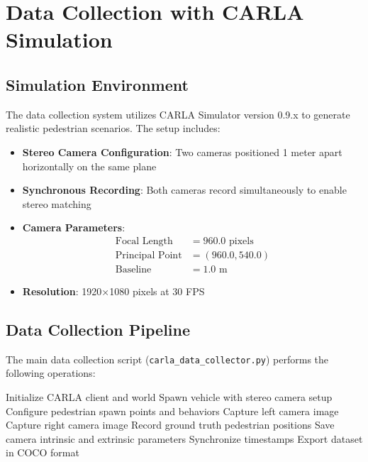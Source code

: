 \documentclass[11pt,a4paper]{article}
\begin{document}
\section{Data Collection with CARLA Simulation}

\subsection{Simulation Environment}

The data collection system utilizes CARLA Simulator version 0.9.x to generate realistic pedestrian scenarios. The setup includes:

\begin{itemize}
    \item \textbf{Stereo Camera Configuration}: Two cameras positioned 1 meter apart horizontally on the same plane
    \item \textbf{Synchronous Recording}: Both cameras record simultaneously to enable stereo matching
    \item \textbf{Camera Parameters}:
    \begin{align*}
        \text{Focal Length} &= 960.0 \text{ pixels} \\
        \text{Principal Point} &= (960.0, 540.0) \\
        \text{Baseline} &= 1.0 \text{ m}
    \end{align*}
    \item \textbf{Resolution}: 1920×1080 pixels at 30 FPS
\end{itemize}

\subsection{Data Collection Pipeline}

The main data collection script (\texttt{carla\_data\_collector.py}) performs the following operations:

\begin{algorithm}
\caption{CARLA Data Collection Process}
\begin{algorithmic}[1]
\State Initialize CARLA client and world
\State Spawn vehicle with stereo camera setup
\State Configure pedestrian spawn points and behaviors
    \State Capture left camera image
    \State Capture right camera image
    \State Record ground truth pedestrian positions
    \State Save camera intrinsic and extrinsic parameters
    \State Synchronize timestamps
\EndFor
\State Export dataset in COCO format
\end{algorithmic}
\end{algorithm}
\end{document}
